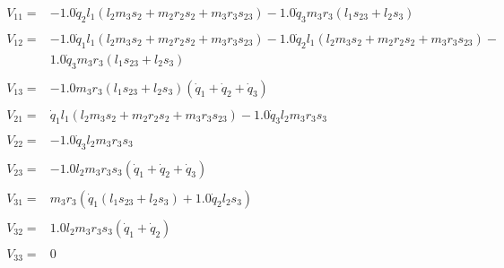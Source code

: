 \begin{align}
    \begin{split}
        V_{11} =& - 1.0 \dot{q}_2 l_{1} \left(l_{2} m_{3} s_{2} + m_{2} r_{2} s_{2} + m_{3} r_{3} s_{23}\right) - 1.0 \dot{q}_3 m_{3} r_{3} \left(l_{1} s_{23} + l_{2} s_{3}\right)
    \end{split}
    \nonumber \\
    \begin{split}
        V_{12} =& - 1.0 \dot{q}_1 l_{1} \left(l_{2} m_{3} s_{2} + m_{2} r_{2} s_{2} + m_{3} r_{3} s_{23}\right) - 1.0 \dot{q}_2 l_{1} \left(l_{2} m_{3} s_{2} + m_{2} r_{2} s_{2} + m_{3} r_{3} s_{23}\right) -\\
            & 1.0 \dot{q}_3 m_{3} r_{3} \left(l_{1} s_{23} + l_{2} s_{3}\right)
    \end{split}
    \nonumber \\
    \begin{split}
        V_{13} =& - 1.0 m_{3} r_{3} \left(l_{1} s_{23} + l_{2} s_{3}\right) \left(\dot{q}_1 + \dot{q}_2 + \dot{q}_3\right)
    \end{split}
    \label{eq:3r-dyn-cc-cris-matrix-row1} \\
    \begin{split}
        V_{21} =& \dot{q}_1 l_{1} \left(l_{2} m_{3} s_{2} + m_{2} r_{2} s_{2} + m_{3} r_{3} s_{23}\right) - 1.0 \dot{q}_3 l_{2} m_{3} r_{3} s_{3}
    \end{split}
    \nonumber \\
    \begin{split}
        V_{22} =& - 1.0 \dot{q}_3 l_{2} m_{3} r_{3} s_{3}
    \end{split}
    \nonumber \\
    \begin{split}
        V_{23} =& - 1.0 l_{2} m_{3} r_{3} s_{3} \left(\dot{q}_1 + \dot{q}_2 + \dot{q}_3\right)
    \end{split}
    \label{eq:3r-dyn-cc-cris-matrix-row2} \\
    \begin{split}
        V_{31} =& m_{3} r_{3} \left(\dot{q}_1 \left(l_{1} s_{23} + l_{2} s_{3}\right) + 1.0 \dot{q}_2 l_{2} s_{3}\right)
    \end{split}
    \nonumber \\
    \begin{split}
        V_{32} =& 1.0 l_{2} m_{3} r_{3} s_{3} \left(\dot{q}_1 + \dot{q}_2\right)
    \end{split}
    \nonumber \\
    \begin{split}
        V_{33} =& 0
    \end{split}
    \label{eq:3r-dyn-cc-cris-matrix-row3}
\end{align}

